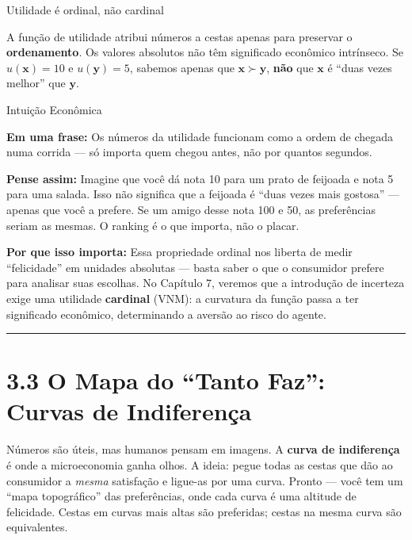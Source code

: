 \documentclass[11pt,twoside,openright]{book}
\begin{document}
\begin{notebox}{Utilidade é ordinal, não cardinal}

A função de utilidade atribui números a cestas apenas para preservar o
\textbf{ordenamento}. Os valores absolutos não têm significado econômico
intrínseco. Se \(u(\mathbf{x}) = 10\) e \(u(\mathbf{y}) = 5\), sabemos
apenas que \(\mathbf{x} \succ \mathbf{y}\), \textbf{não} que
\(\mathbf{x}\) é ``duas vezes melhor'' que \(\mathbf{y}\).

\end{notebox}

\begin{intuitionbox}{Intuição Econômica}

\textbf{Em uma frase:} Os números da utilidade funcionam como a ordem de
chegada numa corrida --- só importa quem chegou antes, não por quantos
segundos.

\textbf{Pense assim:} Imagine que você dá nota 10 para um prato de
feijoada e nota 5 para uma salada. Isso não significa que a feijoada é
``duas vezes mais gostosa'' --- apenas que você a prefere. Se um amigo
desse nota 100 e 50, as preferências seriam as mesmas. O ranking é o que
importa, não o placar.

\textbf{Por que isso importa:} Essa propriedade ordinal nos liberta de
medir ``felicidade'' em unidades absolutas --- basta saber o que o
consumidor prefere para analisar suas escolhas. No Capítulo 7, veremos
que a introdução de incerteza exige uma utilidade \textbf{cardinal}
(VNM): a curvatura da função passa a ter significado econômico,
determinando a aversão ao risco do agente.

\end{intuitionbox}

\begin{center}\rule{0.5\linewidth}{0.5pt}\end{center}

\section{3.3 O Mapa do ``Tanto Faz'': Curvas de
Indiferença}\label{o-mapa-do-tanto-faz-curvas-de-indiferenuxe7a}

Números são úteis, mas humanos pensam em imagens. A \textbf{curva de
indiferença} é onde a microeconomia ganha olhos. A ideia: pegue todas as
cestas que dão ao consumidor a \emph{mesma} satisfação e ligue-as por
uma curva. Pronto --- você tem um ``mapa topográfico'' das preferências,
onde cada curva é uma altitude de felicidade. Cestas em curvas mais
altas são preferidas; cestas na mesma curva são equivalentes.
\end{document}
